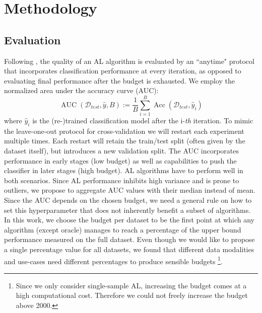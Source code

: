 \documentclass[]{article}
\begin{document}
\section{Methodology}

\subsection{Evaluation}\label{sec:evaluation}
Following \cite{zhou2021towards}, the quality of an AL algorithm is evaluated by an ``anytime" protocol that incorporates classification performance at every iteration, as opposed to evaluating final performance after the budget is exhausted.
We employ the normalized area under the accuracy curve (AUC):
\begin{equation}\label{eq:auc}
	\operatorname{AUC}(\mathcal{D}_{test}, \hat y, B) := \frac{1}{B} \sum_{i=1}^{B} \operatorname{Acc}(\mathcal{D}_{test}, \hat y_i)
\end{equation}
where $\hat y_i$ is the (re-)trained classification model after the i-\textit{th} iteration.
To mimic the leave-one-out protocol for cross-validation we will restart each experiment multiple times.
Each restart will retain the train/test split (often given by the dataset itself), but introduces a new validation split.
The AUC incorporates performance in early stages (low budget) as well as capabilities to push the classifier in later stages (high budget).
AL algorithms have to perform well in both scenarios. 
Since AL performance inhibits high variance and is prone to outliers, we propose to aggregate AUC values with their median instead of mean. \\ [1mm]
Since the AUC depends on the chosen budget, we need a general rule on how to set this hyperparameter that does not inherently benefit a subset of algorithms.
In this work, we choose the budget per dataset to be the first point at which any algorithm (except oracle) manages to reach a percentage of the upper bound performance measured on the full dataset.
Even though we would like to propose a single percentage value for all datasets, we found that different data modalities and use-cases need different percentages to produce sensible budgets
\footnote{Since we only consider single-sample AL, increasing the budget comes at a high computational cost. Therefore we could not freely increase the budget above 2000.}.
\end{document}

